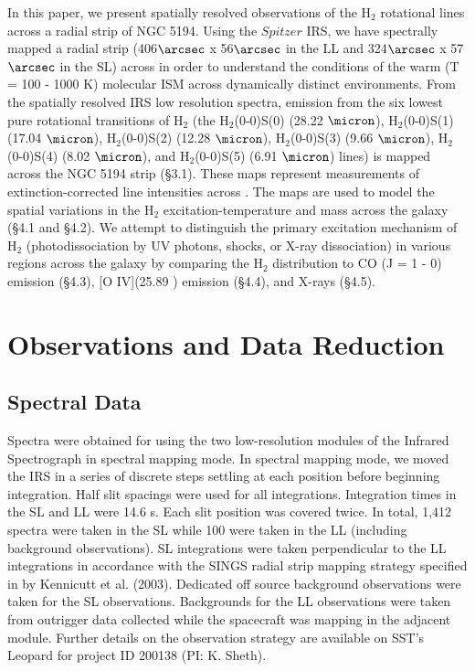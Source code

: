 \documentclass[manuscript]{aastex}
\begin{document}
In this paper, we present spatially resolved observations of the $\mathrm{H_2}$ rotational lines across a radial strip of NGC 5194.  Using the $Spitzer$ IRS, we have spectrally mapped a radial strip (406$\arcsec$ x 56$\arcsec$ in the LL and 324$\arcsec$ x 57$\arcsec$ in the SL) across  in order to understand the conditions of the warm (T = 100 - 1000 K) molecular ISM across dynamically distinct environments.  From the spatially resolved IRS low resolution spectra, emission from the six lowest pure rotational transitions of $\mathrm{H_2}$ (the $\mathrm{H_2}$(0-0)S(0) (28.22 $\micron$), $\mathrm{H_2}$(0-0)S(1) (17.04 $\micron$), $\mathrm{H_2}$(0-0)S(2) (12.28 $\micron$), $\mathrm{H_2}$(0-0)S(3) (9.66 $\micron$), $\mathrm{H_2}$(0-0)S(4) (8.02 $\micron$), and $\mathrm{H_2}$(0-0)S(5) (6.91 $\micron$) lines) is mapped across the NGC 5194 strip (\S3.1).  These maps represent measurements of extinction-corrected line intensities across .  The maps are used to model the spatial variations in the $\mathrm{H_2}$ excitation-temperature and mass across the galaxy (\S4.1 and \S4.2).  We attempt to distinguish the primary excitation mechanism of $\mathrm{H_2}$ (photodissociation by UV photons, shocks, or X-ray dissociation) in various regions across the galaxy by comparing the $\mathrm{H_2}$ distribution to CO (J = 1 - 0) emission (\S4.3), [O IV](25.89 \micron) emission (\S4.4), and X-rays (\S4.5).   

\section{Observations and Data Reduction}

\subsection{Spectral Data}

Spectra were obtained for  using the two low-resolution modules of the Infrared Spectrograph in spectral mapping mode. In spectral mapping mode, we moved the IRS in a series of discrete steps settling at each position before beginning integration.  Half slit spacings were used for all integrations. Integration times in the SL and LL were 14.6 s.  Each slit position was covered twice.  In total, 1,412 spectra were taken in the SL while 100 were taken in the LL (including background observations).  SL integrations were taken perpendicular to the LL integrations in accordance with the SINGS radial strip mapping strategy specified in by Kennicutt et al. (2003).  Dedicated off source background observations were taken for the SL observations.  Backgrounds for the LL observations were taken from outrigger data collected while the spacecraft was mapping in the adjacent module.  Further details on the observation strategy are available on SST's Leopard for project ID 200138 (PI: K. Sheth).
\end{document}
